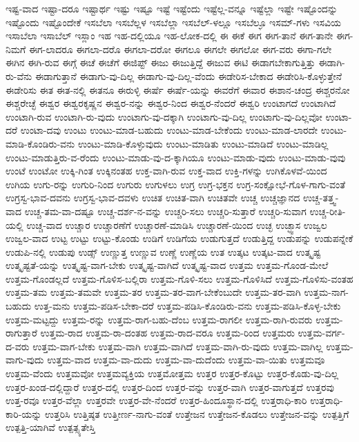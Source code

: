 {ಇಷ್ಟ-ವಾದ
ಇಷ್ಟಾ-ದರೂ
ಇಷ್ಟಾರ್ಥ
ಇಷ್ಟು
ಇಷ್ಟೂ
ಇಷ್ಟೆ
ಇಷ್ಟೆಂದು
ಇಷ್ಟೆಲ್ಲ-ವನ್ನೂ
ಇಷ್ಟೆಲ್ಲಾ
ಇಷ್ಟೇ
ಇಷ್ಟೊಂದನ್ನು
ಇಷ್ಟೊಂದು
ಇಷ್ಟೊಂದೇಕೆ
ಇಸಬೆಲಾ
ಇಸಬೆಲ್ಲಳ
ಇಸಬೆಲ್ಲಾ
ಇಸಬೆಲ್-ಳಲ್ಲೂ
ಇಸಬೆಲ್ಳೂ
ಇಸಮ್-ಗಳು
ಇಸವಿಯ
ಇಸಾಬೆಲಾ
ಇಸಾಬೆಲ್
ಇಸ್ಲಾಂ
ಇಹ
ಇಹ-ದಲ್ಲಿಯೂ
ಇಹ-ಲೋಕ-ದಲ್ಲಿ
ಈ
ಈಕೆ
ಈಗ
ಈಗ-ತಾನೆ
ಈಗ-ತಾನೇ
ಈಗ-ನಿಮಗೆ
ಈಗ-ಲಾದರೂ
ಈಗಲಾ-ದರೊ
ಈಗಲಾ-ದರೋ
ಈಗಲೂ
ಈಗಲೇ
ಈಗಲೋ
ಈಗ-ವರು
ಈಗಾ-ಗಲೇ
ಈಗಿನ
ಈಗಿ-ರುವ
ಈಗ್ಗೆ
ಈಚೆ
ಈಚೆಗೆ
ಈಜಿಪ್ಟ್
ಈಜು
ಈಜುತ್ತಿದ್ದೆ
ಈಜುವ
ಈಟಿ
ಈಡಾಗಬೇಕಾಗುತ್ತಿತ್ತು
ಈಡಾಗಿ-ರು-ವೆನು
ಈಡಾಗುತ್ತಾನೆ
ಈಡಾಗು-ವು-ದಿಲ್ಲ
ಈಡಾಗು-ವು-ದಿಲ್ಲ-ವೆಂದು
ಈಡೇರಿಸ-ಬೇಕಾದ
ಈಡೇರಿಸಿ-ಕೊಳ್ಳುತ್ತೇನೆ
ಈಡೇರಿಸು
ಈತ
ಈತ-ನಲ್ಲಿ
ಈತನೂ
ಈರುಳ್ಳಿ
ಈರ್ಷೆ
ಈರ್ಷೆ-ಯನ್ನು
ಈವರೆಗೆ
ಈವಾರ
ಈಶಾನ-ಚಂದ್ರ
ಈಶ್ಚರನೋ
ಈಶ್ಚರೇಚ್ಛೆ
ಈಶ್ವರ
ಈಶ್ವರಕೃಷ್ಣನ
ಈಶ್ವರ-ನನ್ನು
ಈಶ್ವರ-ನಿಂದ
ಈಶ್ವರ-ನೆಂದರೆ
ಈಶ್ವರಿ
ಉಂಟಾಗದೆ
ಉಂಟಾಗಿದೆ
ಉಂಟಾಗಿ-ರುವ
ಉಂಟಾಗಿ-ರು-ವುದು
ಉಂಟಾಗು-ವು-ದಕ್ಕಾಗಿ
ಉಂಟಾಗು-ವು-ದಿಲ್ಲ
ಉಂಟಾಗು-ವು-ದಿಲ್ಲವೋ
ಉಂಟಾ-ದರೆ
ಉಂಟಾ-ದವು
ಉಂಟು
ಉಂಟು-ಮಾಡ-ಬಹುದು
ಉಂಟು-ಮಾಡ-ಬೇಕೆಂದು
ಉಂಟು-ಮಾಡ-ಲಾರದೇ
ಉಂಟು-ಮಾಡಿ-ಕೊಂಡಿರು-ವನು
ಉಂಟು-ಮಾಡಿ-ಕೊಳ್ಳುವುದು
ಉಂಟು-ಮಾಡಿತು
ಉಂಟು-ಮಾಡಿದೆ
ಉಂಟು-ಮಾಡಿಲ್ಲ
ಉಂಟು-ಮಾಡುತ್ತಿರು-ವ-ರೆಂದು
ಉಂಟು-ಮಾಡು-ವು-ದ-ಕ್ಕಾಗಿಯೂ
ಉಂಟು-ಮಾಡು-ವುದು
ಉಂಟು-ಮಾಡು-ವುವು
ಉಂಟೆ
ಉಂಟೋ
ಉಕ್ಕಿ-ಗಿಂತ
ಉಕ್ಕಿನಂತಹ
ಉಕ್ತ-ವಾಗಿ-ರುವ
ಉಕ್ತ-ವಾದ
ಉಕ್ತಿ-ಗಳನ್ನು
ಉಗಿಕೊಳವೆ-ಯಿಂದ
ಉಗಿಯ
ಉಗು-ರನ್ನು
ಉಗುರಿ-ನಿಂದ
ಉಗುರು
ಉಗುಳಲು
ಉಗ್ರ
ಉಗ್ರ-ಭಕ್ತನ
ಉಗ್ರ-ಸಂಕ್ಷೋಭೆ-ಗೊಳ-ಗಾಗು-ವಂತೆ
ಉಗ್ರಸ್ವ-ಭಾವ-ದವನು
ಉಗ್ರಸ್ವ-ಭಾವ-ದವಳು
ಉಚಿತ
ಉಚಿತ-ವಾಗಿ
ಉಚಿತವೇ
ಉಚ್ಚ
ಉಚ್ಚಜ್ಞಾನದ
ಉಚ್ಚ-ತತ್ತ್ವ-ವಾದ
ಉಚ್ಚ-ತಮ-ವಾ-ದಷ್ಟೂ
ಉಚ್ಚ-ದರ್ಶ-ನ-ವನ್ನು
ಉಚ್ಚರಿ-ಸಲು
ಉಚ್ಚರಿ-ಸುತ್ತಾರೆ
ಉಚ್ಚರಿ-ಸುವಾಗ
ಉಚ್ಚ-ರೀತಿ-ಯಲ್ಲಿ
ಉಚ್ಚ-ವಾದ
ಉಚ್ಚಾರ
ಉಚ್ಚಾರಣೆಗೆ
ಉಚ್ಚಾರಣೆ-ಮಾಡಿಸಿ
ಉಚ್ಚಾರಣೆ-ಯಿಂದ
ಉಚ್ಛ
ಉಚ್ಛ್ವಾಸ
ಉಜ್ವಲ
ಉಜ್ವಲ-ವಾದ
ಉಟ್ಟ
ಉಟ್ಟು
ಉಟ್ಟು-ಕೊಂಡು
ಉಡಿಗೆ
ಉಡಿಗೆಯ
ಉಡುಗುತ್ತದೆ
ಉಡುತ್ತಿದ್ದ
ಉಡುಪನ್ನು
ಉಡುಪನ್ನೇಕೆ
ಉಡುಪಿ-ನಲ್ಲಿ
ಉಡುಪು
ಉಡ್ಸ್
ಉಣ್ಣುತ್ತ
ಉಣ್ಣುವ
ಉಣ್ಣೆ
ಉಣ್ಣೆಯ
ಉತ
ಉತ್ಕಟ
ಉತ್ಕಟ-ವಾದ
ಉತ್ಕೃಷ್ಟ
ಉತ್ಕೃಷ್ಟತೆ-ಯನ್ನು
ಉತ್ಕೃಷ್ಟ-ವಾಗ-ಬೇಕು
ಉತ್ಕೃಷ್ಟ-ವಾಗಿದೆ
ಉತ್ಕೃಷ್ಟ-ವಾದ
ಉತ್ತಮ
ಉತ್ತಮ-ಗೊಂಡ-ಮೇಲೆ
ಉತ್ತಮ-ಗೊಂಡಲ್ಲದೆ
ಉತ್ತಮ-ಗೊಳಿಸ-ಬಲ್ಲಿರಾ
ಉತ್ತಮ-ಗೊಳಿ-ಸಲು
ಉತ್ತಮ-ಗೊಳಿಸಿದೆ
ಉತ್ತಮ-ಗೊಳಿಸು-ವಂತಹ
ಉತ್ತಮ-ತಮ
ಉತ್ತಮ-ತಮವೇ
ಉತ್ತಮ-ತರ
ಉತ್ತಮ-ತರ-ವಾಗ-ಬೇಕೆಂಬುದೇ
ಉತ್ತಮ-ತರ-ವಾಗಿ
ಉತ್ತಮ-ನಾಗ-ಬಹುದು
ಉತ್ತ-ಮನು
ಉತ್ತಮ-ಪಡಿಸ-ಬೇಕಾ-ದರೆ
ಉತ್ತಮ-ಪಡಿಸಿ-ಕೊಂಡಿರು-ವನು
ಉತ್ತಮ-ಪಡಿಸಿ-ಕೊಳ್ಳ-ಬೇಕು
ಉತ್ತಮ-ಮಟ್ಟದ್ದು
ಉತ್ತಮ-ರನ್ನು
ಉತ್ತಮ-ರಾಗ-ಬಹು-ದೆಂಬ
ಉತ್ತಮ-ರಾಗಲೀ
ಉತ್ತಮ-ರಾಗಿ-ರುವರು
ಉತ್ತಮ-ರಾಗುತ್ತಾರೆ
ಉತ್ತಮ-ರಾದ
ಉತ್ತಮ-ರಾ-ದಂತಹ
ಉತ್ತಮ-ರಾದ-ವರೂ
ಉತ್ತಮ-ರಿಂದ
ಉತ್ತಮರು
ಉತ್ತಮ-ವರ್ಗ-ದ-ವರು
ಉತ್ತಮ-ವಾಗ-ಬೇಕು
ಉತ್ತಮ-ವಾಗಿ
ಉತ್ತಮ-ವಾಗಿದೆ
ಉತ್ತಮ-ವಾಗಿ-ರು-ವುದು
ಉತ್ತಮ-ವಾಗಿಲ್ಲ
ಉತ್ತಮ-ವಾಗು-ವುದು
ಉತ್ತಮ-ವಾದ
ಉತ್ತಮ-ವಾ-ದುದು
ಉತ್ತಮ-ವಾ-ದುದೆಂದು
ಉತ್ತಮ-ವಾ-ಯಿತು
ಉತ್ತಮವೂ
ಉತ್ತಮ-ವೆಂದು
ಉತ್ತಮವೋ
ಉತ್ತಮವ್ಯಕ್ತಿಯ
ಉತ್ತಮೋತ್ತಮ
ಉತ್ತರ
ಉತ್ತರ-ಕೊಟ್ಟು
ಉತ್ತರ-ಕೊಡು-ವು-ದಿಲ್ಲ
ಉತ್ತರ-ಖಂಡ-ದಲ್ಲಿದ್ದಾರೆ
ಉತ್ತರ-ದಲ್ಲಿ
ಉತ್ತರ-ದಿಂದ
ಉತ್ತರ-ವನ್ನು
ಉತ್ತರ-ವಾಗಿ
ಉತ್ತರ-ವಾಗುತ್ತದೆ
ಉತ್ತರವು
ಉತ್ತ-ರವೂ
ಉತ್ತರ-ವೆಲ್ಲಾ
ಉತ್ತರವೇ
ಉತ್ತರ-ವೇ-ನೆಂದರೆ
ಉತ್ತರ-ಹಿಂದೂಸ್ಥಾನ-ದಲ್ಲಿ
ಉತ್ತರಾಧಿ-ಕಾರಿ
ಉತ್ತರಾಧಿ-ಕಾರಿ-ಯನ್ನು
ಉತ್ತರಿಸಿ
ಉತ್ತಿಷ್ಠತ
ಉತ್ತೀರ್ಣ-ನಾಗು-ವಂತೆ
ಉತ್ತೇಜನ
ಉತ್ತೇಜನ-ಕೊಡಲು
ಉತ್ತೇಜನ-ವನ್ನು
ಉತ್ಪತ್ತಿಗೆ
ಉತ್ಪತ್ತಿ-ಯಾಗಿವೆ
ಉತ್ಪತ್ಸ್ಯತೇಸ್ತಿ
}
